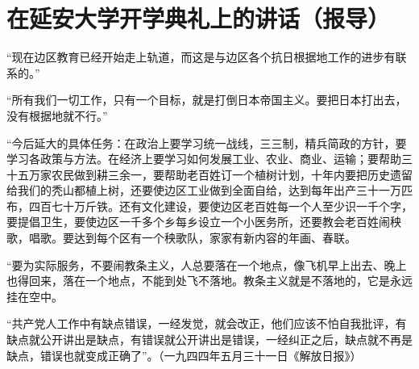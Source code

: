 \section[在延安大学开学典礼上的讲话（报导）（一九四四年五月二十四日）]{在延安大学开学典礼上的讲话（报导）}


“现在边区教育已经开始走上轨道，而这是与边区各个抗日根据地工作的进步有联系的。”

“所有我们一切工作，只有一个目标，就是打倒日本帝国主义。要把日本打出去，没有根据地就不行。”

“今后延大的具体任务：在政治上要学习统一战线，三三制，精兵简政的方针，要学习各政策与方法。在经济上要学习如何发展工业、农业、商业、运输；要帮助三十五万家农民做到耕三余一，要帮助老百姓订一个植树计划，十年内要把历史遗留给我们的秃山都植上树，还要使边区工业做到全面自给，达到每年出产三十一万匹布，四百七十万斤铁。还有文化建设，要使边区老百姓每一个人至少识一千个字，要提倡卫生，要使边区一千多个乡每乡设立一个小医务所，还要教会老百姓闹秧歌，唱歌。要达到每个区有一个秧歌队，家家有新内容的年画、春联。

“要为实际服务，不要闹教条主义，人总要落在一个地点，像飞机早上出去、晚上也得回来，落在一个地点，不能到处飞不落地。教条主义就是不落地的，它是永远挂在空中。

“共产党人工作中有缺点错误，一经发觉，就会改正，他们应该不怕自我批评，有缺点就公开讲出是缺点，有错误就公开讲出是错误，一经纠正之后，缺点就不再是缺点，错误也就变成正确了”。（一九四四年五月三十一日《解放日报》）

